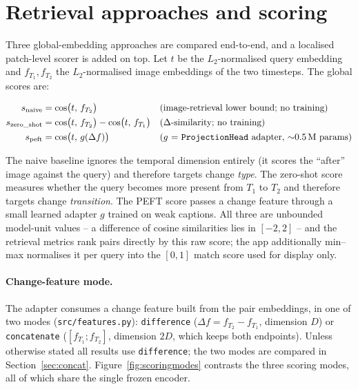 \documentclass{article}
\begin{document}
\section{Retrieval approaches and scoring}
\label{sec:methods}

Three global-embedding approaches are compared end-to-end, and a localised
patch-level scorer is added on top. Let $t$ be the $L_2$-normalised query
embedding and $f_{T_1}, f_{T_2}$ the $L_2$-normalised image embeddings of the
two timesteps. The global scores are:

\begin{align}
    s_{\text{naive}}     &= \cos\!\big(t,\, f_{T_2}\big) && \text{(image-retrieval lower bound; no training)} \\
    s_{\text{zero\_shot}} &= \cos\!\big(t,\, f_{T_2}\big) - \cos\!\big(t,\, f_{T_1}\big) && \text{($\Delta$-similarity; no training)} \\
    s_{\text{peft}}      &= \cos\!\big(t,\, g(\Delta f)\big) && \text{($g$ = \texttt{ProjectionHead} adapter, $\sim$0.5\,M params)}
\end{align}

The naive baseline ignores the temporal dimension entirely (it scores the
``after'' image against the query) and therefore targets change \emph{type}. The
zero-shot score measures whether the query becomes more present from $T_1$ to
$T_2$ and therefore targets change \emph{transition}. The PEFT score passes a
change feature through a small learned adapter $g$ trained on weak captions.
All three are unbounded model-unit values -- a difference of cosine similarities
lies in $[-2, 2]$ -- and the retrieval metrics rank pairs directly by this raw
score; the app additionally min--max normalises it per query into the $[0,1]$
match score used for display only.

\paragraph{Change-feature mode.}
The adapter consumes a change feature built from the pair embeddings, in one of
two modes (\texttt{src/features.py}): \texttt{difference}
($\Delta f = f_{T_2} - f_{T_1}$, dimension $D$) or \texttt{concatenate}
($[f_{T_1} ; f_{T_2}]$, dimension $2D$, which keeps both endpoints). Unless
otherwise stated all results use \texttt{difference}; the two modes are compared
in Section~\ref{sec:concat}. Figure~\ref{fig:scoringmodes} contrasts the three
scoring modes, all of which share the single frozen encoder.
\end{document}
